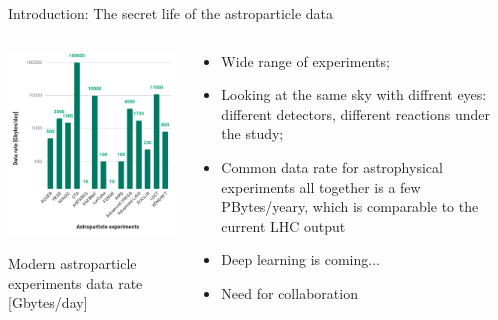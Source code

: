 \documentclass[18pt]{beamer}
\begin{document}
\begin{frame}{Introduction: The secret life of the astroparticle data}
\small
\begin{columns}
  \begin{column}[t]{0.45\textwidth}
    \begin{center}
      \includegraphics[width=0.79\linewidth]{pics/appec_base4.png}
    \end{center}
    \vspace{-2\parsep}
    \small Modern astroparticle experiments data rate [Gbytes/day]\footnotemark[1] %
  \end{column}
  \hfill
  \begin{column}[t]{0.53\textwidth}
    \begin{itemize}
    \item Wide range of experiments;
    \item Looking at the same sky with diffrent eyes: different detectors, different reactions under the study;
    \item Common data rate for astrophysical experiments all together is a few PBytes/yeary, which is comparable to the current LHC output\footnotemark[1] %
    \item Deep learning is coming...
    \item Need for collaboration
    \end{itemize}


\end{column}
\end{columns}
\end{frame}
\end{document}
